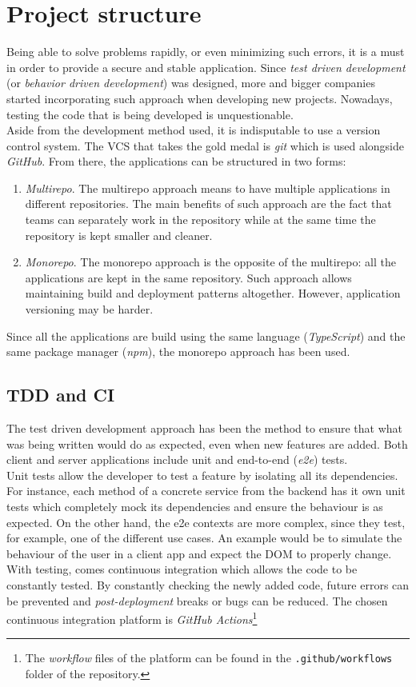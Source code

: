 \documentclass[a4paper, 12pt, oneside]{book}
\begin{document}
\section{Project structure}
Being able to solve problems rapidly, or even minimizing such errors, it is a must in order to provide a secure and stable application. Since \emph{test driven development} (or \emph{behavior driven development}) was designed, more and bigger companies started incorporating such approach when developing new projects. Nowadays, testing the code that is being developed is unquestionable.
\\[8pt]
Aside from the development method used, it is indisputable to use a version control system. The VCS that takes the gold medal is \emph{git} which is used alongside \emph{GitHub}. From there, the applications can be structured in two forms:
\begin{enumerate}[label = -]
	\item \emph{Multirepo}. The multirepo approach means to have multiple applications in different repositories. The main benefits of such approach are the fact that teams can separately work in the repository while at the same time the repository is kept smaller and cleaner.
	\item \emph{Monorepo}. The monorepo approach is the opposite of the multirepo: all the applications are kept in the same repository. Such approach allows maintaining build and deployment patterns altogether. However, application versioning may be harder.
\end{enumerate}
Since all the applications are build using the same language (\emph{TypeScript}) and the same package manager (\emph{npm}), the monorepo approach has been used.
\subsection{TDD and CI}
The test driven development approach has been the method to ensure that what was being written would do as expected, even when new features are added. Both client and server applications include unit and end-to-end (\emph{e2e}) tests.
\\[8pt]
Unit tests allow the developer to test a feature by isolating all its dependencies. For instance, each method of a concrete service from the backend has it own unit tests which completely mock its dependencies and ensure the behaviour is as expected. On the other hand, the e2e contexts are more complex, since they test, for example, one of the different use cases. An example would be to simulate the behaviour of the user in a client app and expect the DOM to properly change.
\\[8pt]
With testing, comes continuous integration which allows the code to be constantly tested. By constantly checking the newly added code, future errors can be prevented and \emph{post-deployment} breaks or bugs can be reduced. The chosen continuous integration platform is \emph{GitHub Actions}\footnote{The \emph{workflow} files of the platform can be found in the \texttt{.github/workflows} folder of the repository.}
\end{document}
